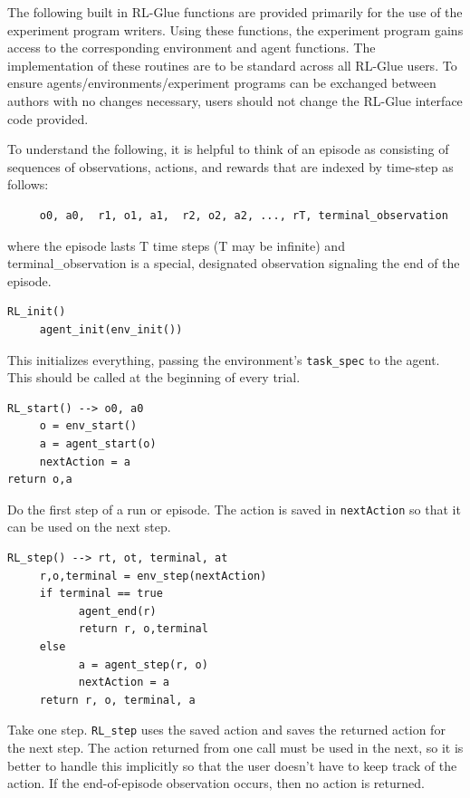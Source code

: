 \documentclass[11pt]{article}
\begin{document}
The following built in RL-Glue functions are provided primarily for the use of the experiment program writers. Using these functions, the experiment program gains access to the corresponding environment and agent functions. The implementation of these routines are to be standard across all RL-Glue users. To ensure agents/environments/experiment programs can be exchanged between authors with no changes necessary, users should not change the RL-Glue interface code provided.


To understand the following, it is helpful to think of an episode as consisting of sequences of observations, actions, and rewards that are indexed by time-step as follows:
\begin{verbatim}
     o0, a0,  r1, o1, a1,  r2, o2, a2, ..., rT, terminal_observation
\end{verbatim}
where the episode lasts T time steps (T may be infinite) and terminal\_observation is a special, designated observation signaling the end of the episode.

\begin{verbatim}
RL_init()
     agent_init(env_init())
\end{verbatim}
This initializes everything, passing the environment's \texttt{task\_spec} to the agent. This should be called at the beginning of every trial.
\begin{verbatim}
RL_start() --> o0, a0
     o = env_start()
     a = agent_start(o)
     nextAction = a
return o,a
\end{verbatim}

Do the first step of a run or episode.  The action is saved in \texttt{nextAction} so that it can be used on the next step.
\begin{verbatim}
RL_step() --> rt, ot, terminal, at
     r,o,terminal = env_step(nextAction)
     if terminal == true
           agent_end(r)
           return r, o,terminal
     else
           a = agent_step(r, o)
           nextAction = a
     return r, o, terminal, a 
\end{verbatim}
Take one step.  \texttt{RL\_step} uses the saved action and saves the returned action for the next step.  The action returned from one call must be used in the next, so it is better to handle this implicitly so that the user doesn't have to keep track of the action.  If the end-of-episode observation occurs, then no action is returned.
\end{document}
